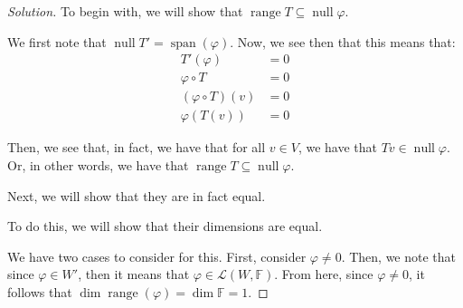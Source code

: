 \documentclass{article}
\newenvironment{solution}{\begin{proof}[Solution]}{\end{proof}}
\DeclareMathOperator*{\vspan}{\mathrm{span}}
\DeclareMathOperator*{\vnull}{\mathrm{null}}
\DeclareMathOperator*{\vrange}{\mathrm{range}}
\begin{document}
	\begin{solution}
		To begin with, we will show that $\vrange T \subseteq \vnull \varphi$.		
		
		We first note that $\vnull T' = \vspan(\varphi)$. Now, we see then that this means that:
		\begin{align*}
			T'(\varphi) &= 0\\
			\varphi \circ T &= 0 \\
			(\varphi \circ T)(v) &= 0 \\
			\varphi(T(v)) &= 0 \tag{for all $v \in V$}
		\end{align*}
	
		Then, we see that, in fact, we have that for all $v \in V$, we have that $Tv \in \vnull \varphi$. Or, in other words, we have that $\vrange T \subseteq \vnull \varphi$.
		
		Next, we will show that they are in fact equal. 
		
		To do this, we will show that their dimensions are equal. 
	\begin{comment}
			First, we note that since $V,W$ is finite-dimensional, then
			\begin{equation*}
			\vnull T' = (\vrange T)^{0}
		\end{equation*}
	
		This means then that $(\vrange T)^{0} = \vspan(\varphi)$. Then, $\dim (\vrange T)^{0} = \dim(\vspan(\varphi))$. If $\varphi$ is in fact the zero map, then $\dim(\vspan(\varphi)) = 0$, otherwise it'll be equal to 1. We note then that
		\begin{align*}
			\dim W &= \dim \vrange T + \dim (\vrange T)^{0} \\
			\dim \vrange T &= \dim W - \dim (\vrange T)^{0} \\
			 &= \dim W - \dim(\vspan(\varphi))
		\end{align*}
	\end{comment}

		We have two cases to consider for this. First, consider $\varphi \neq 0$. Then, we note that since $\varphi \in W'$, then it means that $\varphi \in \mathcal L(W, \mathbb{F})$. From here, since $\varphi \neq 0$, it follows that $\dim \vrange (\varphi) = \dim \mathbb{F} = 1$. \begin{comment}
			we note that $\vrange \varphi = \left\{  \varphi (w) : w \in W\right\}$. However, we note that since $\varphi(w) \in \mathbb{F}$, and $\varphi \neq 0$, it follows that $\dim \vrange (\varphi) = 1$.
		\end{comment}
		

\end{solution}
\end{document}

